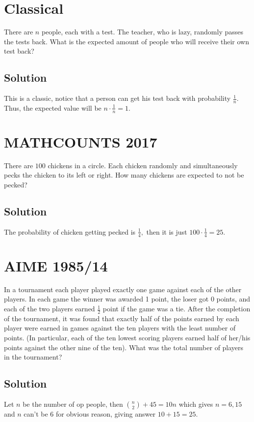 \documentclass[blue,onecol]{shooting}
\begin{document}
\section{Classical} 
There are $n$ people, each with a test. The teacher, who is lazy, randomly passes the tests back. What is the expected amount of people who will receive their own test back?
\subsection{Solution}
This is a classic, notice that a person can get his test back with probability $\frac1n$. Thus, the expected value will be $n\cdot\frac1n = 1.$ 
	


\section{MATHCOUNTS 2017} There are $100$ chickens in a circle. Each chicken randomly and simultaneously pecks the chicken to its left or right. How many chickens are expected to not be pecked?
\subsection{Solution}
The probability of chicken getting pecked is $\frac14,$ then it is just $100\cdot\frac14=25.$



\section{AIME 1985/14} In a tournament each player played exactly one game against each of the other players. In each game the winner was awarded 1 point, the loser got 0 points, and each of the two players earned $\frac{1}{2}$ point if the game was a tie. After the completion of the tournament, it was found that exactly half of the points earned by each player were earned in games against the ten players with the least number of points. (In particular, each of the ten lowest scoring players earned half of her/his points against the other nine of the ten). What was the total number of players in the tournament?
\subsection{Solution}

Let $n$ be the number of op people, then $\binom n2+ 45 = 10n$ which gives $n=6,15$ and $n$ can't be $6$ for 
obvious reason, giving answer $10+15=25.$
\end{document}
